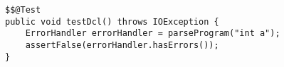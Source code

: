 \begin{lstlisting}[caption={Simple declaration test}, label={test2}]
$$@Test
public void testDcl() throws IOException {
    ErrorHandler errorHandler = parseProgram("int a");
    assertFalse(errorHandler.hasErrors());
}
\end{lstlisting}